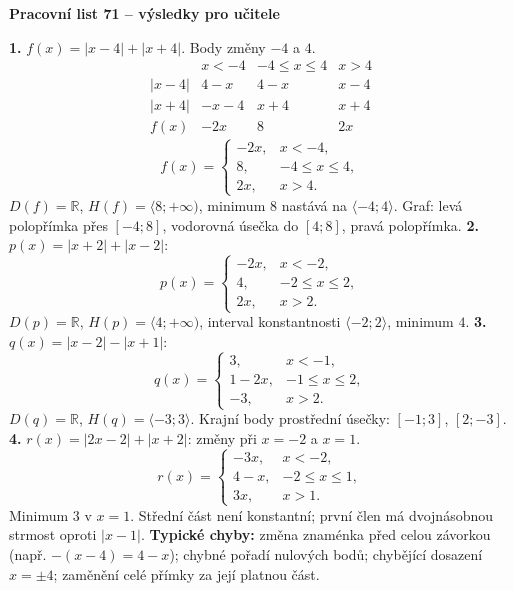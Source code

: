 \documentclass[11pt,a4paper]{article}
\begin{document}
{\Large\bfseries Pracovní list 71 – výsledky pro učitele}\par
\smallskip
\textbf{1.} $f(x)=|x-4|+|x+4|$. Body změny $-4$ a $4$.
\[
\begin{array}{c|ccc}
 &x<-4&-4\le x\le4&x>4\\\hline
|x-4|&4-x&4-x&x-4\\
|x+4|&-x-4&x+4&x+4\\\hline
f(x)&-2x&8&2x
\end{array}
\]
\[
f(x)=\begin{cases}-2x,&x<-4,\\8,&-4\le x\le4,\\2x,&x>4.\end{cases}
\]
$D(f)=\mathbb R$, $H(f)=\langle8;+\infty)$, minimum $8$ nastává na $\langle-4;4\rangle$. Graf: levá polopřímka přes $[-4;8]$, vodorovná úsečka do $[4;8]$, pravá polopřímka.
\bigskip
\textbf{2.} $p(x)=|x+2|+|x-2|$:
\[
p(x)=\begin{cases}-2x,&x<-2,\\4,&-2\le x\le2,\\2x,&x>2.\end{cases}
\]
$D(p)=\mathbb R$, $H(p)=\langle4;+\infty)$, interval konstantnosti $\langle-2;2\rangle$, minimum $4$.
\bigskip
\textbf{3.} $q(x)=|x-2|-|x+1|$:
\[
q(x)=\begin{cases}3,&x<-1,\\1-2x,&-1\le x\le2,\\-3,&x>2.\end{cases}
\]
$D(q)=\mathbb R$, $H(q)=\langle-3;3\rangle$. Krajní body prostřední úsečky: $[-1;3]$, $[2;-3]$.
\bigskip
\textbf{4.} $r(x)=|2x-2|+|x+2|$: změny při $x=-2$ a $x=1$.
\[
r(x)=\begin{cases}-3x,&x<-2,\\4-x,&-2\le x\le1,\\3x,&x>1.\end{cases}
\]
Minimum $3$ v $x=1$. Střední část není konstantní; první člen má dvojnásobnou strmost oproti $|x-1|$.
\medskip
\textbf{Typické chyby:} změna znaménka před celou závorkou (např. $-(x-4)=4-x$); chybné pořadí nulových bodů; chybějící dosazení $x=\pm4$; zaměnění celé přímky za její platnou část.
\end{document}
